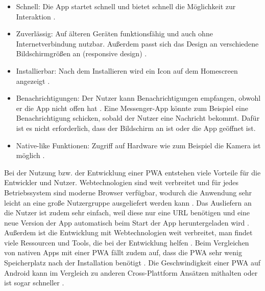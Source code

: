 \begin{itemize}
  \item Schnell: Die App startet schnell und bietet schnell die Möglichkeit zur Interaktion \autocite{Hajian2019} \autocite{Sheppard2017}.
  \item Zuverlässig: Auf älteren Geräten funktionsfähig und auch ohne Internetverbindung nutzbar. Außerdem passt sich das Design an verschiedene Bildschirmgrößen an (responsive design) \autocite{Hajian2019} \autocite{Sheppard2017}.
  \item Installierbar: Nach dem Installieren wird ein Icon auf dem Homescreen angezeigt \autocite{Hajian2019} \autocite{Sheppard2017} \autocite{Rojas2020}.
  \item Benachrichtigungen: Der Nutzer kann Benachrichtigungen empfangen, obwohl er die App nicht offen hat \autocite{Hajian2019} \autocite{Sheppard2017}. Eine Messenger-App könnte zum Beispiel eine Benachrichtigung schicken, sobald der Nutzer eine Nachricht bekommt. Dafür ist es nicht erforderlich, dass der Bildschirm an ist oder die App geöffnet ist.
  \item Native-like Funktionen: Zugriff auf Hardware wie zum Beispiel die Kamera ist möglich \autocite{Hajian2019}.
\end{itemize}

Bei der Nutzung bzw. der Entwicklung einer \ac{PWA} entstehen viele Vorteile für die Entwickler und Nutzer. Webtechnologien sind weit verbreitet und für jedes Betriebssystem sind moderne Browser verfügbar, wodurch die Anwendung sehr leicht an eine große Nutzergruppe ausgeliefert werden kann \autocite{Rojas2020}. Das Ausliefern an die Nutzer ist zudem sehr einfach, weil diese nur eine URL benötigen \autocite{KHAN2019289} und eine neue Version der App automatisch beim Start der App heruntergeladen wird \autocite{Rojas2020}. Außerdem ist die Entwicklung mit Webtechnologien weit verbreitet, man findet viele Ressourcen und Tools, die bei der Entwicklung helfen \autocite{Rojas2020}. Beim Vergleichen von nativen Apps mit einer \ac{PWA} fällt zudem auf, dass die \ac{PWA} sehr wenig Speicherplatz nach der Installation benötigt \autocite{biorn2017} \autocite{KHAN2019289}. Die Geschwindigkeit einer \ac{PWA} auf Android kann im Vergleich zu anderen Cross-Plattform Ansätzen mithalten oder ist sogar schneller \autocite{biorn2017}.

